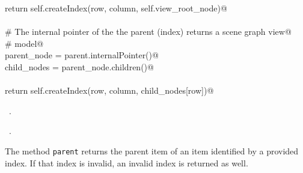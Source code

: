 \documentclass[
    a4paper,      %
    10pt,         %
    openright,    %
    notitlepage,  %
    parskip=half, %
]{scrreprt}       %
\theoremstyle{definition}                    %
\begin{document}
\begin{flushleft}
\begin{minipage}{\linewidth}
\begin{list}{}{}
\mbox{}\lstinline@        return self.createIndex(row, column, self.view_root_node)@\\
\mbox{}\lstinline@@\\
\mbox{}\lstinline@    # The internal pointer of the the parent (index) returns a scene graph view@\\
\mbox{}\lstinline@    # model@\\
\mbox{}\lstinline@    parent_node = parent.internalPointer()@\\
\mbox{}\lstinline@    child_nodes = parent_node.children()@\\
\mbox{}\lstinline@@\\
\mbox{}\lstinline@    return self.createIndex(row, column, child_nodes[row])@\\
\mbox{}\lstinline@@{\NWsep}
\end{list}
\vspace{-1.5ex}
\footnotesize
\begin{list}{}{\setlength{\itemsep}{-\parsep}\setlength{\itemindent}{-\leftmargin}}
\item \NWtxtMacroDefBy\ .
\item \NWtxtMacroRefIn\ .

\item{}
\end{list}
\end{minipage}\vspace{4ex}
\end{flushleft}
The method \verb+parent+ returns the parent item of an item identified by a
provided index. If that index is invalid, an invalid index is returned as well.
\end{document}
